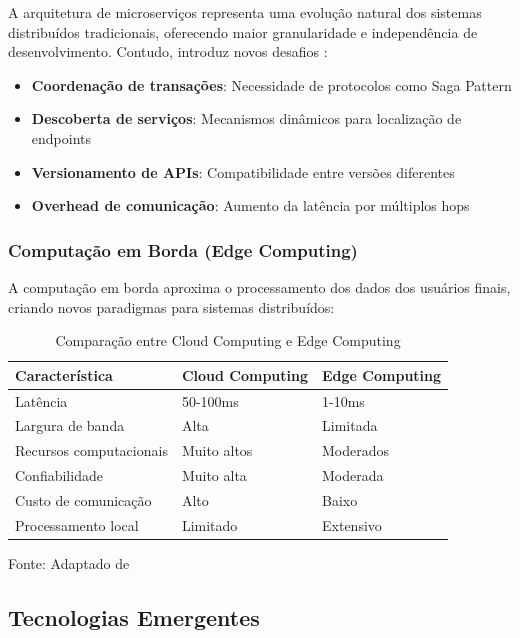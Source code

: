A arquitetura de microserviços representa uma evolução natural dos sistemas distribuídos tradicionais, oferecendo maior granularidade e independência de desenvolvimento. Contudo, introduz novos desafios \cite{tanenbaum2016sistemas}:

\begin{itemize}
    \item \textbf{Coordenação de transações}: Necessidade de protocolos como Saga Pattern
    \item \textbf{Descoberta de serviços}: Mecanismos dinâmicos para localização de endpoints
    \item \textbf{Versionamento de APIs}: Compatibilidade entre versões diferentes
    \item \textbf{Overhead de comunicação}: Aumento da latência por múltiplos hops
\end{itemize}

\subsubsection{Computação em Borda (Edge Computing)}

A computação em borda aproxima o processamento dos dados dos usuários finais, criando novos paradigmas para sistemas distribuídos:

\begin{table}[H]
\centering
\caption{Comparação entre Cloud Computing e Edge Computing}
\begin{tabular}{|l|l|l|}
\hline
\textbf{Característica} & \textbf{Cloud Computing} & \textbf{Edge Computing} \\
\hline
Latência & 50-100ms & 1-10ms \\
\hline
Largura de banda & Alta & Limitada \\
\hline
Recursos computacionais & Muito altos & Moderados \\
\hline
Confiabilidade & Muito alta & Moderada \\
\hline
Custo de comunicação & Alto & Baixo \\
\hline
Processamento local & Limitado & Extensivo \\
\hline
\end{tabular}

\label{tab:cloud_vs_edge}

{\fontsize{10pt}{\baselineskip}\selectfont
Fonte: Adaptado de }
\end{table}

\subsection{Tecnologias Emergentes}

